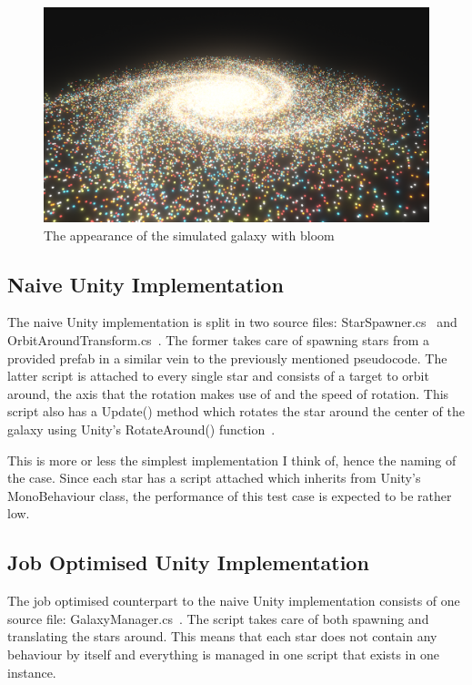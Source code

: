 \begin{figure}[tbph]
    \centering
    \includegraphics[width=1\textwidth]{Figures/bloom.png}
    \caption[Galaxy with bloom]{The appearance of the simulated galaxy with bloom}
    \label{fig:bloom}
\end{figure}

\subsection{Naive Unity Implementation}
The naive Unity implementation is split in two source files: StarSpawner.cs~\cite{naiveSpawner} and OrbitAroundTransform.cs~\cite{naiveOrbiter}. The former takes care of spawning stars from a provided prefab in a similar vein to the previously mentioned pseudocode. The latter script is attached to every single star and consists of a target to orbit around, the axis that the rotation makes use of and the speed of rotation. This script also has a Update() method which rotates the star around the center of the galaxy using Unity's RotateAround() function~\cite{rotateAroundFunction}.

This is more or less the simplest implementation I think of, hence the naming of the case. Since each star has a script attached which inherits from Unity's MonoBehaviour class, the performance of this test case is expected to be rather low.

\subsection{Job Optimised Unity Implementation}
The job optimised counterpart to the naive Unity implementation consists of one source file: GalaxyManager.cs~\cite{jobOptimizedManager}. The script takes care of both spawning and translating the stars around. This means that each star does not contain any behaviour by itself and everything is managed in one script that exists in one instance. 

